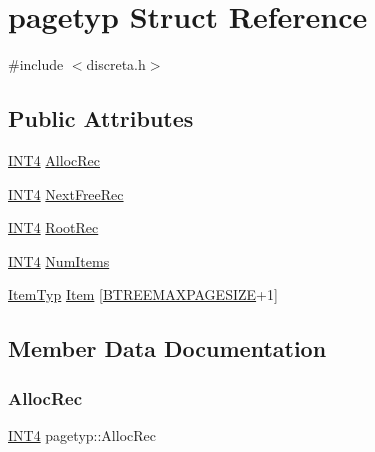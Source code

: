 \hypertarget{structpagetyp}{}\section{pagetyp Struct Reference}
\label{structpagetyp}


{\ttfamily \#include $<$discreta.\+h$>$}

\subsection*{Public Attributes}
\begin{DoxyCompactItemize}
\item 
\mbox{\hyperlink{galois_8h_a6675ac57b948be915e03c09228b57b05}{I\+N\+T4}} \mbox{\hyperlink{structpagetyp_afa5af909647de07bb41cd47202a60b49}{Alloc\+Rec}}
\item 
\mbox{\hyperlink{galois_8h_a6675ac57b948be915e03c09228b57b05}{I\+N\+T4}} \mbox{\hyperlink{structpagetyp_a63cc59ac2ae5822d9df2a473e14aaf21}{Next\+Free\+Rec}}
\item 
\mbox{\hyperlink{galois_8h_a6675ac57b948be915e03c09228b57b05}{I\+N\+T4}} \mbox{\hyperlink{structpagetyp_a0e1b5cdf8897b819b2ca3f4a46bdfce2}{Root\+Rec}}
\item 
\mbox{\hyperlink{galois_8h_a6675ac57b948be915e03c09228b57b05}{I\+N\+T4}} \mbox{\hyperlink{structpagetyp_aba1e45033f320d2ca4a93cd19ae1bdb9}{Num\+Items}}
\item 
\mbox{\hyperlink{discreta_8h_a2fdd526928017b3784ac2ea203f31011}{Item\+Typ}} \mbox{\hyperlink{structpagetyp_ae929989fcece6e6021162d990866d434}{Item}} \mbox{[}\mbox{\hyperlink{discreta_8h_abe72dc49bd2230ce2515b8ef6e5ccf35}{B\+T\+R\+E\+E\+M\+A\+X\+P\+A\+G\+E\+S\+I\+ZE}}+1\mbox{]}
\end{DoxyCompactItemize}


\subsection{Member Data Documentation}
\mbox{\label{structpagetyp_afa5af909647de07bb41cd47202a60b49}} 
\subsubsection{\texorpdfstring{Alloc\+Rec}{AllocRec}}
{\footnotesize\ttfamily \mbox{\hyperlink{galois_8h_a6675ac57b948be915e03c09228b57b05}{I\+N\+T4}} pagetyp\+::\+Alloc\+Rec}

